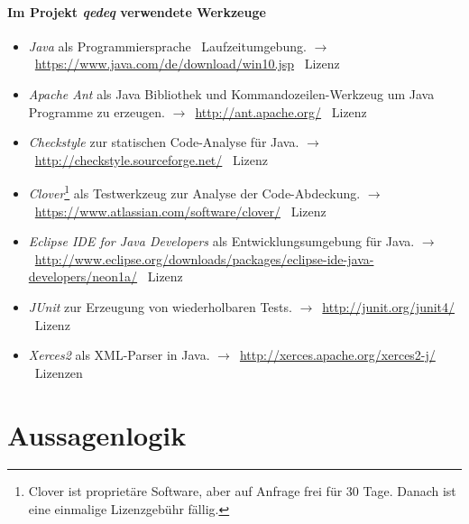 \documentclass[english,ngerman,parskip=half,headsepline,footsepline]{scrreprt}
\newcounter{Enumi}
\begin{document}
	\paragraph{Im Projekt \emph{qedeq} verwendete Werkzeuge}
	\begin{itemize}
		\setcounter{enumi}{\value{Enumi}}

		\item\label{Werkzeug:Java}\emph{Java} als Programmiersprache \textendash\ Laufzeitumgebung. $\rightarrow$~\url{https://www.java.com/de/download/win10.jsp} \textendash\ Lizenz~\cite{bib:JavaSE}

		\item\label{Werkzeug:Apache Ant}\emph{Apache Ant} als Java Bibliothek und Kommandozeilen-Werkzeug um Java Programme zu erzeugen. $\rightarrow$~\url{http://ant.apache.org/} \textendash\ Lizenz~\cite{bib:Apacheii}

		\item\label{Werkzeug:Checkstyle}\emph{Checkstyle} zur statischen Code-Analyse für Java. $\rightarrow$~\url{http://checkstyle.sourceforge.net/} \textendash\ Lizenz~\cite{bib:LGPLii}

		\item\label{Werkzeug:Clover}\emph{Clover}\footnote{ Clover ist proprietäre Software, aber auf Anfrage frei für 30 Tage. Danach ist eine einmalige Lizenzgebühr fällig.} als Testwerkzeug zur Analyse der Code-Abdeckung. $\rightarrow$~\url{https://www.atlassian.com/software/clover/} \textendash\ Lizenz~\cite{bib:Clover}

		\item\label{Werkzeug:Eclipse Java}\emph{Eclipse IDE for Java Developers} als Entwicklungsumgebung für Java. $\rightarrow$~\url{http://www.eclipse.org/downloads/packages/eclipse-ide-java-developers/neon1a/} \textendash\ Lizenz~\cite{bib:OSI}

		\item\label{Werkzeug:JUnit}\emph{JUnit} zur Erzeugung von wiederholbaren Tests. $\rightarrow$~\url{http://junit.org/junit4/} \textendash\ Lizenz~\cite{bib:EPL}

		\item\label{Werkzeug:Xerces2}\emph{Xerces2} als XML-Parser in Java. $\rightarrow$~\url{http://xerces.apache.org/xerces2-j/} \textendash\ Lizenzen~\cite{bib:Apacheii, bib:SAX, bib:WDCDL, bib:WDCSNL}

		\setcounter{Enumi}{\value{enumi}}
	\end{itemize}

	\section{Aussagenlogik} %
	\label{sec:Aussagenlogik}
\end{document}

